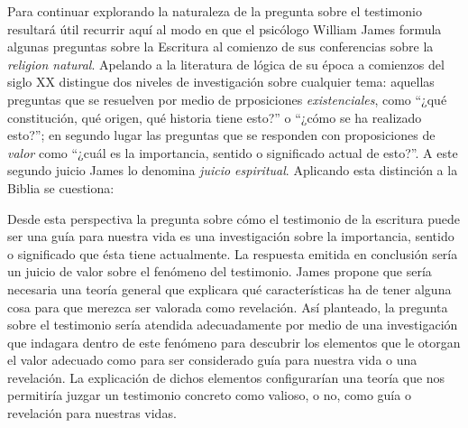   Para continuar explorando la naturaleza de la pregunta sobre el testimonio
  resultará útil recurrir aquí al modo en que el psicólogo William James formula
  algunas preguntas sobre la Escritura al comienzo de sus conferencias sobre la
  \emph{religion natural}. Apelando a la literatura de lógica de su época a
  comienzos del siglo XX distingue dos niveles de investigación sobre cualquier
  tema: aquellas preguntas que se resuelven por medio de prposiciones
  \emph{existenciales}, como ``¿qué constitución, qué origen, qué historia tiene
  esto?'' o ``¿cómo se ha realizado esto?''; en segundo lugar las preguntas que se
  responden con proposiciones de \emph{valor} como ``¿cuál es la importancia,
  sentido o significado actual de esto?''. A este segundo juicio James lo denomina
  \emph{juicio espiritual}. Aplicando esta distinción a la Biblia se cuestiona:


  Desde esta perspectiva la pregunta sobre cómo el testimonio de la escritura
  puede ser una guía para nuestra vida es una investigación sobre la importancia,
  sentido o significado que ésta tiene actualmente. La respuesta emitida en
  conclusión sería un juicio de valor sobre el fenómeno del testimonio. James
  propone que sería necesaria una teoría general que explicara qué características
  ha de tener alguna cosa para que merezca ser valorada como revelación. Así
  planteado, la pregunta sobre el testimonio sería atendida adecuadamente por
  medio de una investigación que indagara dentro de este fenómeno para descubrir
  los elementos que le otorgan el valor adecuado como para ser considerado guía
  para nuestra vida o una revelación. La explicación de dichos elementos
  configurarían una teoría que nos permitiría juzgar un testimonio concreto como
  valioso, o no, como guía o revelación para nuestras vidas.

